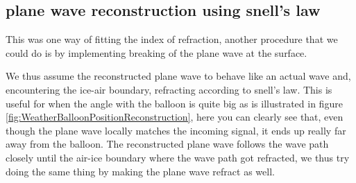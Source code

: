\subsection{plane wave reconstruction using snell's law}
\label{seq:SnellPW}
This was one way of fitting the index of refraction, another procedure
that we could do is by implementing breaking of the plane wave at 
the surface. 

We thus assume the reconstructed plane wave to behave like an actual wave
and, encountering the ice-air boundary, refracting according to snell's law.
This is useful for when the angle with the balloon is quite big as is illustrated
in figure \ref{fig:WeatherBalloonPositionReconstruction}, here you can clearly
see that, even though the plane wave locally matches the incoming signal, it
ends up really far away from the balloon. The reconstructed plane wave follows the
wave path closely until the air-ice boundary where the wave path got refracted,
we thus try doing the same thing by making the plane wave refract as well.

